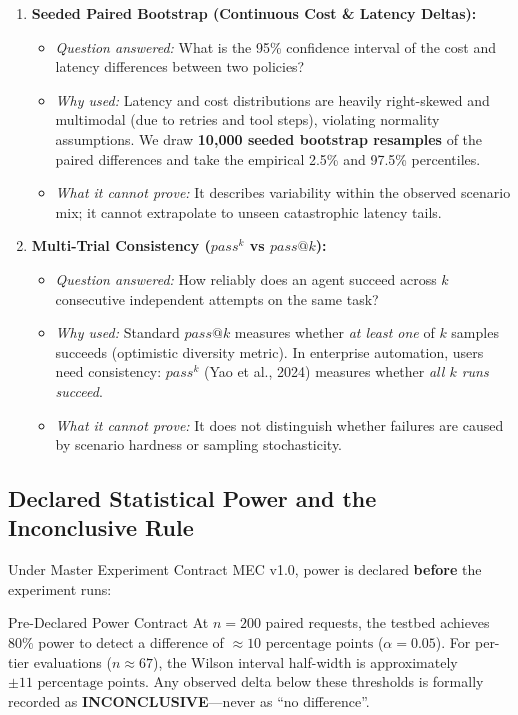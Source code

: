 \begin{enumerate}
    \item \textbf{Seeded Paired Bootstrap (Continuous Cost \& Latency Deltas):}
    \begin{itemize}
        \item \textit{Question answered:} What is the 95\% confidence interval of the cost and latency differences between two policies?
        \item \textit{Why used:} Latency and cost distributions are heavily right-skewed and multimodal (due to retries and tool steps), violating normality assumptions. We draw \textbf{10,000 seeded bootstrap resamples} of the paired differences and take the empirical 2.5\% and 97.5\% percentiles.
        \item \textit{What it cannot prove:} It describes variability within the observed scenario mix; it cannot extrapolate to unseen catastrophic latency tails.
    \end{itemize}

    \item \textbf{Multi-Trial Consistency ($pass^k$ vs $pass@k$):}
    \begin{itemize}
        \item \textit{Question answered:} How reliably does an agent succeed across $k$ consecutive independent attempts on the same task?
        \item \textit{Why used:} Standard $pass@k$ measures whether \textit{at least one} of $k$ samples succeeds (optimistic diversity metric). In enterprise automation, users need consistency: $pass^k$ (Yao et al., 2024) measures whether \textit{all $k$ runs succeed}.
        \item \textit{What it cannot prove:} It does not distinguish whether failures are caused by scenario hardness or sampling stochasticity.
    \end{itemize}
\end{enumerate}

\subsection{Declared Statistical Power and the Inconclusive Rule}
Under Master Experiment Contract MEC v1.0, power is declared \textbf{before} the experiment runs:
\begin{callout}[primary]{Pre-Declared Power Contract}
At $n=200$ paired requests, the testbed achieves $80\%$ power to detect a difference of $\approx 10\text{ percentage points}$ ($\alpha=0.05$). For per-tier evaluations ($n \approx 67$), the Wilson interval half-width is approximately $\pm 11\text{ percentage points}$. Any observed delta below these thresholds is formally recorded as \textbf{INCONCLUSIVE}---never as ``no difference''.
\end{callout}

